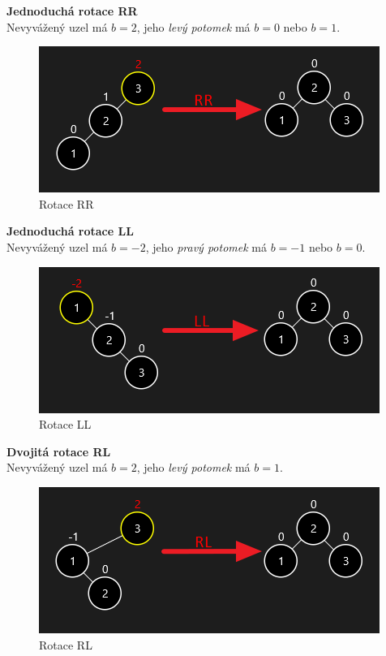 \documentclass[
  biblatex=false,
  font=serif,
  glossaries=false,
  tables=false,
  theorems=false,
  index
]{kidiplom}
\begin{document}
\noindent\textbf{Jednoduchá rotace RR}\\
\noindent Nevyvážený uzel má $b = 2$, jeho \textit{levý potomek} má $b = 0$ nebo $b = 1$.
\begin{figure}[h!]
\centering
	\includegraphics[scale=0.8]{obrazky/11RR.png}
	\caption{Rotace RR}
\end{figure}

\noindent\textbf{Jednoduchá rotace LL}\\
\noindent Nevyvážený uzel má $b = -2$, jeho \textit{pravý potomek} má $b = -1$ nebo $b = 0$.
\begin{figure}[h!]
\centering
	\includegraphics[scale=0.8]{obrazky/12LL.png}
	\caption{Rotace LL}
\end{figure}

\newpage
\noindent\textbf{Dvojitá rotace RL}\\
\noindent Nevyvážený uzel má $b = 2$, jeho \textit{levý potomek} má $b = 1$.
\begin{figure}[h!]
\centering
	\includegraphics[scale=0.8]{obrazky/13RL.png}
	\caption{Rotace RL}
\end{figure}
\end{document}
